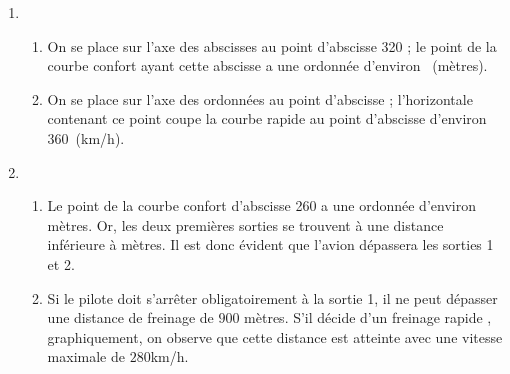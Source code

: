 
\medskip

\begin{enumerate}
\item 
	\begin{enumerate}
		\item On se place sur l'axe des abscisses au point d'abscisse  320 ;  le point de la courbe \og confort \fg{} ayant cette abscisse a une ordonnée  d'environ ~(mètres).
		\item On se place sur  l'axe des ordonnées au point d'abscisse  ; l'horizontale contenant ce point coupe la courbe \og rapide \fg{} au point d'abscisse d'environ $360$~(km/h).
	\end{enumerate}
\item 
	\begin{enumerate}
		\item Le point de la courbe \og confort \fg{} d'abscisse 260 a une ordonnée d'environ  mètres. Or, les
deux premières sorties se trouvent à une distance inférieure à  mètres. Il est donc évident que l'avion dépassera les sorties 1 et 2.
		\item Si le pilote doit s'arrêter obligatoirement à la sortie 1, il ne peut dépasser une distance de freinage de  $900$ mètres. S'il décide d'un freinage \og rapide \fg, graphiquement, on observe que cette distance est atteinte avec une vitesse
maximale de $280$km/h.
	\end{enumerate}
\end{enumerate}

\vspace{0,25cm}

